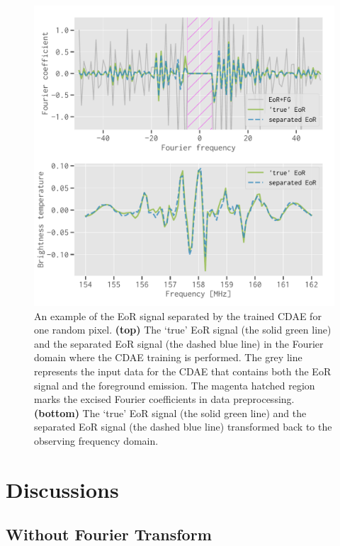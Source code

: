 \documentclass[letters,a4paper,fleqn,usenatbib]{mnras}
\begin{document}
\begin{figure}
  \centering
  \includegraphics[width=\columnwidth]{eor-result}
  \caption{\label{fig:result}%
    An example of the EoR signal separated by the trained CDAE for one
    random pixel.
    \textbf{(top)} The `true' EoR signal (the solid green line) and the
    separated EoR signal (the dashed blue line) in the Fourier domain
    where the CDAE training is performed.
    The grey line represents the input data for the CDAE that contains
    both the EoR signal and the foreground emission.
    The magenta hatched region marks the excised Fourier coefficients
    in data preprocessing.
    \textbf{(bottom)} The `true' EoR signal (the solid green line) and
    the separated EoR signal (the dashed blue line) transformed back to
    the observing frequency domain.
  }
\end{figure}


\section{Discussions}
\label{sec:discussions}

\subsection{Without Fourier Transform}
\label{sec:noft}
\end{document}
